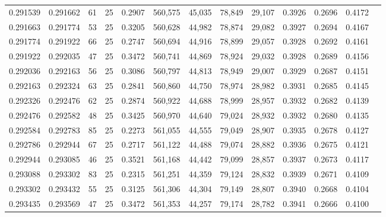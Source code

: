 \begin{tabular}{rrrrrrrrrrrrr}
0.291539 & 0.291662 &    61 &  25 &                                     0.2907 & 560,575 &  45,035 &  78,849 &  29,107 & 0.3926 & 0.2696 & 0.4172 \\
0.291663 & 0.291774 &    53 &  25 &                                     0.3205 & 560,628 &  44,982 &  78,874 &  29,082 & 0.3927 & 0.2694 & 0.4167 \\
0.291774 & 0.291922 &    66 &  25 &                                     0.2747 & 560,694 &  44,916 &  78,899 &  29,057 & 0.3928 & 0.2692 & 0.4161 \\
0.291922 & 0.292035 &    47 &  25 &                                     0.3472 & 560,741 &  44,869 &  78,924 &  29,032 & 0.3928 & 0.2689 & 0.4156 \\
0.292036 & 0.292163 &    56 &  25 &                                     0.3086 & 560,797 &  44,813 &  78,949 &  29,007 & 0.3929 & 0.2687 & 0.4151 \\
0.292163 & 0.292324 &    63 &  25 &                                     0.2841 & 560,860 &  44,750 &  78,974 &  28,982 & 0.3931 & 0.2685 & 0.4145 \\
0.292326 & 0.292476 &    62 &  25 &                                     0.2874 & 560,922 &  44,688 &  78,999 &  28,957 & 0.3932 & 0.2682 & 0.4139 \\
0.292476 & 0.292582 &    48 &  25 &                                     0.3425 & 560,970 &  44,640 &  79,024 &  28,932 & 0.3932 & 0.2680 & 0.4135 \\
0.292584 & 0.292783 &    85 &  25 &                                     0.2273 & 561,055 &  44,555 &  79,049 &  28,907 & 0.3935 & 0.2678 & 0.4127 \\
0.292786 & 0.292944 &    67 &  25 &                                     0.2717 & 561,122 &  44,488 &  79,074 &  28,882 & 0.3936 & 0.2675 & 0.4121 \\
0.292944 & 0.293085 &    46 &  25 &                                     0.3521 & 561,168 &  44,442 &  79,099 &  28,857 & 0.3937 & 0.2673 & 0.4117 \\
0.293088 & 0.293302 &    83 &  25 &                                     0.2315 & 561,251 &  44,359 &  79,124 &  28,832 & 0.3939 & 0.2671 & 0.4109 \\
0.293302 & 0.293432 &    55 &  25 &                                     0.3125 & 561,306 &  44,304 &  79,149 &  28,807 & 0.3940 & 0.2668 & 0.4104 \\
0.293435 & 0.293569 &    47 &  25 &                                     0.3472 & 561,353 &  44,257 &  79,174 &  28,782 & 0.3941 & 0.2666 & 0.4100 \\

\end{tabular}
